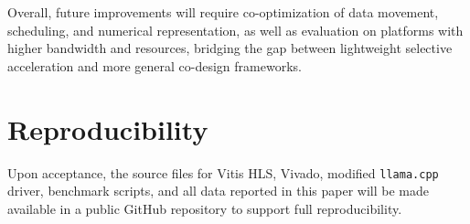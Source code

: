 \documentclass[manuscript,]{acmart} %
\begin{document}
Overall, future improvements will require co-optimization of data movement, scheduling, and numerical representation, as well as evaluation on platforms with higher bandwidth and resources, bridging the gap between lightweight selective acceleration and more general co-design frameworks.
\section*{Reproducibility}
Upon acceptance, the source files for Vitis HLS, Vivado, modified \texttt{llama.cpp} driver, benchmark scripts, and all data reported in this paper will be made available in a public GitHub repository to support full reproducibility.



\end{document}
